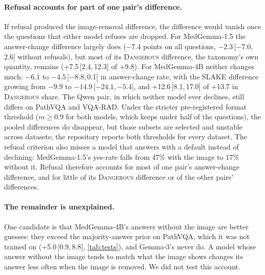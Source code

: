 \documentclass[10pt,twocolumn,letterpaper]{article}
\newcommand{\dang}{\textup{\textsc{Dangerous}}}
\newcommand{\ci}[2]{\,[#1,\,#2]}  %
\begin{document}
\paragraph{Refusal accounts for part of one pair's difference.} If refusal produced the image-removal difference,
the difference would vanish once the questions that either model refuses are dropped. For MedGemma-1.5 the
answer-change difference largely does ($-7.4$ points on all questions, $-2.3$\ci{$-7.0$}{2.6} without refusals),
but most of its \dang{} difference, the taxonomy's own quantity, remains (+7.5\ci{2.4}{12.3} of +9.8). For
MedGemma-4B neither changes much: $-6.1$ to $-4.5$\ci{$-8.8$}{0.1} in answer-change rate, with the SLAKE difference
growing from $-9.9$ to $-14.9$\ci{$-24.1$}{$-5.4$}, and +12.6\ci{8.1}{17.0} of +13.7 in \dang{} share. The Qwen
pair, in which neither model ever declines, still differs on PathVQA and VQA-RAD. Under the stricter
pre-registered format threshold ($m\ge0.9$ for both models, which keeps under half of the questions), the pooled
differences do disappear, but those subsets are selected and unstable across datasets; the repository reports
both thresholds for every dataset. The refusal criterion also misses a model that answers with a default instead
of declining: MedGemma-1.5's yes-rate falls from 47\% with the image to 17\% without it. Refusal therefore
accounts for most of one pair's answer-change difference, and for little of its \dang{} difference or of the
other pairs' differences.

\paragraph{The remainder is unexplained.} One candidate is that MedGemma-4B's answers without the image are better
guesses: they exceed the majority-answer prior on PathVQA, which it was not trained on (+5.0\ci{0.9}{8.8},
\cref{tab:tests}), and Gemma-3's never do. A model whose answer without the image tends to match what the image
shows changes its answer less often when the image is removed. We did not test this account.
\end{document}
